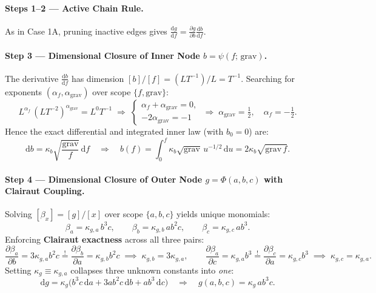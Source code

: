 \documentclass[11pt,a4paper]{article}
\newcommand{\dd}{\mathrm{d}}
\newcommand{\pd}[2]{\frac{\partial #1}{\partial #2}}
\newcommand{\td}[2]{\frac{\dd #1}{\dd #2}}
\newcommand{\dimbr}[1]{\left[#1\right]}
\begin{document}
\paragraph{Steps 1--2 — Active Chain Rule.}
As in Case 1A, pruning inactive edges gives $\td{g}{f} = \pd{g}{b}\td{b}{f}$.

\paragraph{Step 3 — Dimensional Closure of Inner Node $b = \psi(f;\,\text{grav})$.}
The derivative $\td{b}{f}$ has dimension $\dimbr{b}/\dimbr{f} = (LT^{-1})/L = T^{-1}$. Searching for exponents $(\alpha_f, \alpha_{\text{grav}})$ over scope $\{f, \text{grav}\}$:
\[
  L^{\alpha_f}\,(LT^{-2})^{\alpha_{\text{grav}}} = L^0 T^{-1}
  \;\Longrightarrow\;
  \begin{cases}
    \alpha_f + \alpha_{\text{grav}} = 0,\\
    -2\alpha_{\text{grav}} = -1
  \end{cases}
  \;\Longrightarrow\;
  \alpha_{\text{grav}} = \tfrac{1}{2},\quad \alpha_f = -\tfrac{1}{2}.
\]
Hence the exact differential and integrated inner law (with $b_0 = 0$) are:
\begin{equation}
  \dd b = \kappa_b \sqrt{\frac{\text{grav}}{f}}\,\dd f
  \quad\Longrightarrow\quad
  b(f) = \int_0^f \kappa_b \sqrt{\text{grav}}\,u^{-1/2}\,\dd u = 2\kappa_b \sqrt{\text{grav}\,f}.
\end{equation}

\paragraph{Step 4 — Dimensional Closure of Outer Node $g = \Phi(a,b,c)$ with Clairaut Coupling.}
Solving $\dimbr{\beta_x} = \dimbr{g}/\dimbr{x}$ over scope $\{a, b, c\}$ yields unique monomials:
\[
  \beta_a = \kappa_{g,a}\, b^3 c, \qquad
  \beta_b = \kappa_{g,b}\, a b^2 c, \qquad
  \beta_c = \kappa_{g,c}\, a b^3.
\]
Enforcing \textbf{Clairaut exactness} across all three pairs:
\[
  \pd{\beta_a}{b} = 3\kappa_{g,a} b^2 c \stackrel{!}{=} \pd{\beta_b}{a} = \kappa_{g,b} b^2 c
  \;\implies\; \kappa_{g,b} = 3\kappa_{g,a},
  \qquad
  \pd{\beta_a}{c} = \kappa_{g,a} b^3 \stackrel{!}{=} \pd{\beta_c}{a} = \kappa_{g,c} b^3
  \;\implies\; \kappa_{g,c} = \kappa_{g,a}.
\]
Setting $\kappa_g \equiv \kappa_{g,a}$ collapses three unknown constants into \emph{one}:
\begin{equation}
  \dd g = \kappa_g\bigl(b^3 c\,\dd a + 3 a b^2 c\,\dd b + a b^3\,\dd c\bigr)
  \quad\Longrightarrow\quad
  g(a,b,c) = \kappa_g\, a b^3 c.
\end{equation}
\end{document}

